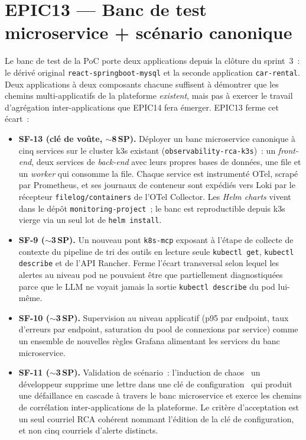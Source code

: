 \documentclass[11pt,a4paper,oneside]{report}
\begin{document}
\section{EPIC13 --- Banc de test microservice + scénario canonique}

Le banc de test de la PoC porte deux applications depuis la
clôture du sprint~3~: le dérivé original
\texttt{react-springboot-mysql} et la seconde application
\texttt{car-rental}. Deux applications à deux composants chacune
suffisent à démontrer que les chemins multi-applicatifs de la
plateforme \emph{existent}, mais pas à exercer le travail
d'agrégation inter-applications que EPIC14 fera émerger. EPIC13
ferme cet écart~:

\begin{itemize}
  \item \textbf{SF-13 (clé de voûte, $\sim$8\,SP).} Déployer un
        banc microservice canonique à cinq services sur le cluster
        k3s existant (\texttt{observability-rca-k3s})~: un
        \emph{front-end}, deux services de \emph{back-end} avec
        leurs propres bases de données, une file et un
        \emph{worker} qui consomme la file. Chaque service est
        instrumenté OTel, scrapé par Prometheus, et ses journaux
        de conteneur sont expédiés vers Loki par le récepteur
        \texttt{filelog/containers} de l'OTel Collector. Les
        \emph{Helm charts} vivent dans le dépôt
        \texttt{monitoring-project}~; le banc est reproductible
        depuis k3s vierge via un seul lot de \texttt{helm install}.
  \item \textbf{SF-9 ($\sim$3\,SP).} Un nouveau pont \texttt{k8s-mcp}
        exposant à l'étape de collecte de contexte du pipeline de
        tri des outils en lecture seule \texttt{kubectl get},
        \texttt{kubectl describe} et de l'API Rancher. Ferme
        l'écart transversal selon lequel les alertes au niveau pod
        ne pouvaient être que partiellement diagnostiquées parce
        que le LLM ne voyait jamais la sortie
        \texttt{kubectl describe} du pod lui-même.
  \item \textbf{SF-10 ($\sim$3\,SP).} Supervision au niveau
        applicatif (p95 par endpoint, taux d'erreurs par endpoint,
        saturation du pool de connexions par service) comme un
        ensemble de nouvelles règles Grafana alimentant les
        services du banc microservice.
  \item \textbf{SF-11 ($\sim$3\,SP).} Validation de scénario~:
        l'induction de chaos \og~un développeur supprime une
        lettre dans une clé de configuration~\fg{} qui produit une
        défaillance en cascade à travers le banc microservice et
        exerce les chemins de corrélation inter-applications de la
        plateforme. Le critère d'acceptation est un seul courriel
        RCA cohérent nommant l'édition de la clé de configuration,
        et non cinq courriels d'alerte distincts.
\end{itemize}
\end{document}
